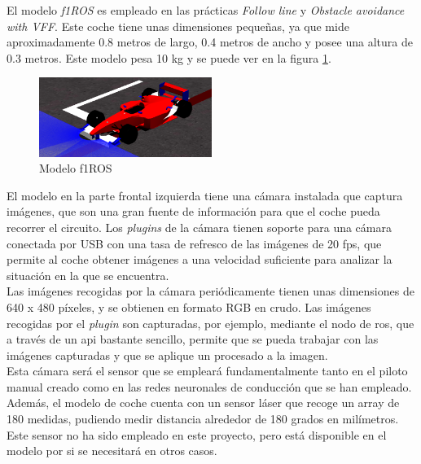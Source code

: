 El modelo \textit{f1ROS} es empleado en las prácticas \textit{Follow line} y \textit{Obstacle avoidance with VFF}. Este coche tiene unas dimensiones pequeñas, ya que mide aproximadamente 0.8 metros de largo, 0.4 metros de ancho y posee una altura de 0.3 metros. Este modelo pesa 10 kg y se puede ver en la figura \ref{fig.f1}.\\

\begin{figure}[H]
  \begin{center}
    \includegraphics[width=0.5\textwidth]{figures/Infraestructura/f1.png}
		\caption{Modelo f1ROS}
		\label{fig.f1}
		\end{center}
\end{figure}

El modelo en la parte frontal izquierda tiene una cámara instalada que captura imágenes, que son una gran fuente de información para que el coche pueda recorrer el circuito. Los \textit{plugins} de la cámara tienen soporte para una cámara conectada por USB con una tasa de refresco de las imágenes de 20 fps, que permite al coche obtener imágenes a una velocidad suficiente para analizar la situación en la que se encuentra.\\

Las imágenes recogidas por la cámara periódicamente tienen unas dimensiones de 640 x 480 píxeles, y se obtienen en formato RGB en crudo. Las imágenes recogidas por el \textit{plugin} son capturadas, por ejemplo, mediante el nodo de \acrshort{ros}, que a través de un \acrshort{api} bastante sencillo, permite que se pueda trabajar con las imágenes capturadas y que se aplique un procesado a la imagen.\\

Esta cámara será el sensor que se empleará fundamentalmente tanto en el piloto manual creado como en las redes neuronales de conducción que se han empleado. Además, el modelo de coche cuenta con un sensor láser que recoge un array de 180 medidas, pudiendo medir distancia alrededor de 180 grados en milímetros. Este sensor no ha sido empleado en este proyecto, pero está disponible en el modelo por si se necesitará en otros casos. \\

